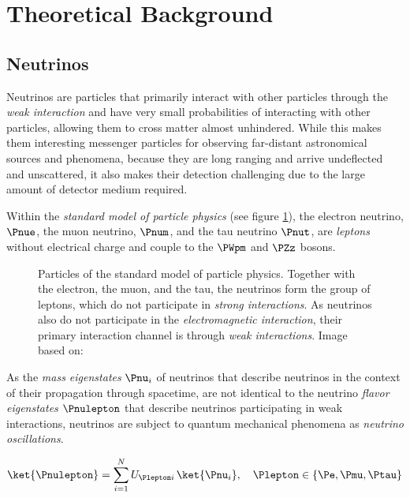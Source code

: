 
\section{Theoretical Background}
\label{sec:theoretical_background}

\subsection{Neutrinos}
\label{sec:neutrinos}

Neutrinos are particles that primarily interact with other particles through the \textit{weak interaction} and have very small probabilities of interacting with other particles, allowing them to cross matter almost unhindered. While this makes them interesting messenger particles for observing far-distant astronomical sources and phenomena, because they are long ranging and arrive undeflected and unscattered, it also makes their detection challenging due to the large amount of detector medium required. \cite{lexikonderphysik, instrumentation}

Within the \textit{standard model of particle physics} (see figure \ref{fig:Pheith9i}), the electron neutrino, $\Pnue$, the muon neutrino, $\Pnum$, and the tau neutrino $\Pnut$, are \textit{leptons} without electrical charge and couple to the $\PWpm$ and $\PZz$ bosons.

\begin{figure}[htbp]
  \caption{Particles of the standard model of particle physics. Together with the electron, the muon, and the tau, the neutrinos form the group of leptons, which do not participate in \textit{strong interactions}. As neutrinos also do not participate in the \textit{electromagnetic interaction}, their primary interaction channel is through \textit{weak interactions}. Image based on: \cite{standardmodel}}
  \label{fig:Pheith9i}
\end{figure}

As the \textit{mass eigenstates} $\Pnu_i$ of neutrinos that describe neutrinos in the context of their propagation through spacetime, are not identical to the neutrino \textit{flavor eigenstates} $\Pnulepton$ that describe neutrinos participating in weak interactions, neutrinos are subject to quantum mechanical phenomena as \textit{neutrino oscillations}. \cite{particledatareview}

$$
  \ket{\Pnulepton} = \sum_{i=1}^N U_{\Plepton i}\,\ket{\Pnu_i}, \ \ \ \Plepton \in \{ \Pe, \Pmu, \Ptau \}
$$

